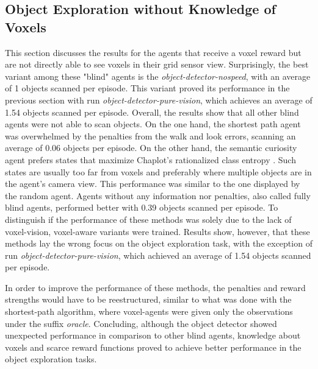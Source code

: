     
    

    \subsection{Object Exploration without Knowledge of Voxels}
        
        This section discusses the results for the agents that receive a voxel reward but are not directly able to see voxels in their grid sensor view.
        Surprisingly, the best variant among these "blind" agents is the \textit{object-detector-nospeed}, with an average of 1 objects scanned per episode. This variant proved its performance in the previous section with run \textit{object-detector-pure-vision}, which achieves an average of 1.54 objects scanned per episode. 
        Overall, the results show that all other blind agents were not able to scan objects. On the one hand, the shortest path agent was overwhelmed by the penalties from the walk and look errors, scanning an average of 0.06 objects per episode. On the other hand, the semantic curiosity agent prefers states that maximize Chaplot's rationalized class entropy \cite{chaplot2020semantic}. Such states are usually too far from voxels and preferably where multiple objects are in the agent's camera view. This performance was similar to the one displayed by the random agent. Agents without any information nor penalties, also called fully blind agents, performed better with 0.39 objects scanned per episode. 
        To distinguish if the performance of these methods was solely due to the lack of voxel-vision, voxel-aware variants were trained. Results show, however, that these methods lay the wrong focus on the object exploration task, with the exception of run \textit{object-detector-pure-vision}, which achieved an average of 1.54 objects scanned per episode.
       
        In order to improve the performance of these methods, the penalties and reward strengths would have to be reestructured, similar to what was done with the shortest-path algorithm, where voxel-agents were given only the observations under the suffix \textit{oracle}.
        Concluding, although the object detector showed unexpected performance in comparison to other blind agents, knowledge about voxels and scarce reward functions proved to achieve better performance in the object exploration tasks.
                
